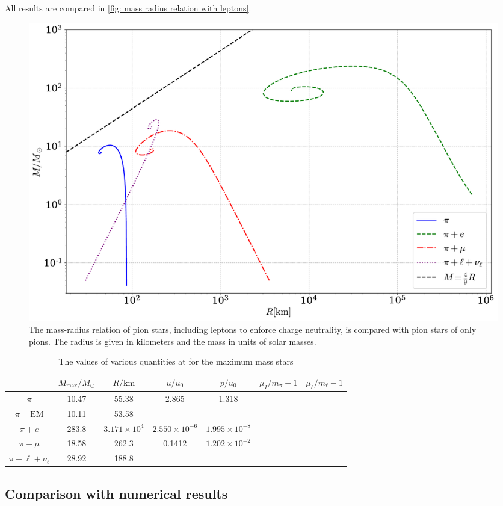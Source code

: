 All results are compared in \autoref{fig: mass radius relation with leptons}.

\begin{figure}[!htb]
    \centering
    \includegraphics[width=\textwidth]{../scripts/figurer/pion_star/mass_radius_all.pdf}
    \caption{
        The mass-radius relation of pion stars, including leptons to enforce charge neutrality, is compared with pion stars of only pions.
        The radius is given in kilometers and the mass in units of solar masses.
        }
        \label{fig: mass radius relation with leptons}
\end{figure}


\begin{table}
    \centering
    \caption{The values of various quantities at for the maximum mass stars}
    \begin{tabular}{c  c  c  c  c c c}
        \hline \hline
        & $M_\text{max}/M_\odot$ & $R / \text{km}$ & $u/u_0$ & $p/u_0$ & $\mu_I/m_\pi-1$ & $\mu_\ell/m_\ell-1$ \\
        \hline
        $\pi$& 10.47 & 55.38 & 2.865 & 1.318 && \\
        $\pi + \text{EM}$& 10.11 & 53.58 &&&& \\
        $\pi + e$& 283.8 & $3.171 \times10^4$ & $2.550\times10^{-6}$ & $1.995\times10^{-8}$ && \\
        $\pi + \mu$& 18.58 & 262.3 & 0.1412 & $1.202\times 10^{-2}$ && \\
        $\pi + \ell + \nu_\ell$& 28.92 & 188.8 &  &  &&
    \end{tabular}
\end{table}



\subsection{Comparison with numerical results}

